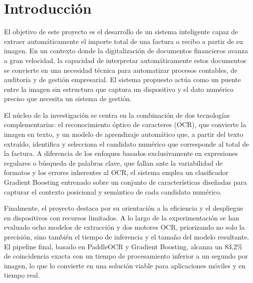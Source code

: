 \section{Introducción}
\label{sec:introduccion}

El objetivo de este proyecto es el desarrollo de un sistema inteligente capaz de extraer automáticamente el importe total de una factura o recibo a partir de su imagen. En un contexto donde la digitalización de documentos financieros avanza a gran velocidad, la capacidad de interpretar automáticamente estos documentos se convierte en una necesidad técnica para automatizar procesos contables, de auditoría y de gestión empresarial. El sistema propuesto actúa como un puente entre la imagen sin estructura que captura un dispositivo y el dato numérico preciso que necesita un sistema de gestión.

El núcleo de la investigación se centra en la combinación de dos tecnologías complementarias: el reconocimiento óptico de caracteres (OCR), que convierte la imagen en texto, y un modelo de aprendizaje automático que, a partir del texto extraído, identifica y selecciona el candidato numérico que corresponde al total de la factura. A diferencia de los enfoques basados exclusivamente en expresiones regulares o búsqueda de palabras clave, que fallan ante la variabilidad de formatos y los errores inherentes al OCR, el sistema emplea un clasificador Gradient Boosting entrenado sobre un conjunto de características diseñadas para capturar el contexto posicional y semántico de cada candidato numérico.

Finalmente, el proyecto destaca por su orientación a la eficiencia y el despliegue en dispositivos con recursos limitados. A lo largo de la experimentación se han evaluado ocho modelos de extracción y dos motores OCR, priorizando no solo la precisión, sino también el tiempo de inferencia y el tamaño del modelo resultante. El pipeline final, basado en PaddleOCR y Gradient Boosting, alcanza un 83,2\% de coincidencia exacta con un tiempo de procesamiento inferior a un segundo por imagen, lo que lo convierte en una solución viable para aplicaciones móviles y en tiempo real.
